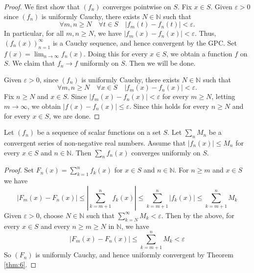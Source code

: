 \documentclass[a4paper]{article}
\begin{document}
\begin{proof}
    We first show that $\left(f_{n}\right)$ converges pointwise on $S$. Fix $x \in S$. Given $\varepsilon>0$ since $\left(f_{n}\right)$ is uniformly Cauchy, there exists $N \in \mathbb{N}$ such that
    \[
    \forall m, n \geqslant N \quad \forall t \in S \quad\left|f_{m}(t)-f_{n}(t)\right|<\varepsilon.
    \]
    In particular, for all $m, n \geqslant N$, we have $\left|f_{m}(x)-f_{n}(x)\right|<\varepsilon$. Thus, $\left(f_{n}(x)\right)_{n=1}^{\infty}$ is a Cauchy sequence, and hence convergent by the GPC. Set $f(x)=\lim _{n \rightarrow \infty} f_{n}(x)$. Doing this for every $x \in S$, we obtain a function $f$ on $S$.
    We claim that $f_{n} \rightarrow f$ uniformly on $S$. Then we will be done. 
    
    Given $\varepsilon>0$, since $\left(f_{n}\right)$ is uniformly Cauchy, there exists $N \in \mathbb{N}$ such that
    \[
    \forall m, n \geqslant N \quad \forall x \in S \quad\left|f_{m}(x)-f_{n}(x)\right|<\varepsilon.
    \]
    Fix $n \geqslant N$ and $x \in S$. Since $\left|f_{m}(x)-f_{n}(x)\right|<\varepsilon$ for every $m \geqslant N$, letting $m \rightarrow \infty$, we obtain $\left|f(x)-f_{n}(x)\right| \leqslant \varepsilon$. Since this holds for every $n \geqslant N$ and for every $x \in S$, we are done.
\end{proof}
\begin{theorem}\label{thm:7}
    Let $\left(f_{n}\right)$ be a sequence of scalar functions on a set $S$. Let $\sum_{n} M_{n}$ be a convergent series of non-negative real numbers. Assume that $\left|f_{n}(x)\right| \leqslant M_{n}$ for every $x \in S$ and $n \in \mathbb{N}$. Then $\sum_{n} f_{n}(x)$ converges uniformly on $S$.
\end{theorem}
\begin{proof}
    Set $F_{n}(x)=\sum_{k=1}^{n} f_{k}(x)$ for $x \in S$ and $n \in \mathbb{N}$. For $n \geqslant m$ and $x \in S$ we have
    \[
    \left|F_{m}(x)-F_{n}(x)\right| \leqslant\left|\sum_{k=m+1}^{n} f_{k}(x)\right| \leqslant \sum_{k=m+1}^{n}\left|f_{k}(x)\right| \leqslant \sum_{k=m+1}^{n} M_{k}
    \]
    Given $\varepsilon>0$, choose $N \in \mathbb{N}$ such that $\sum_{k=N}^{\infty} M_{k}<\varepsilon$. Then by the above, for every $x \in S$ and every $n \geqslant m \geqslant N$ in $\mathbb{N}$, we have
    \[
    \left|F_{m}(x)-F_{n}(x)\right| \leqslant \sum_{k=m+1}^{n} M_{k}<\varepsilon
    \]
    So $\left(F_{n}\right)$ is uniformly Cauchy, and hence uniformly convergent by Theorem \ref{thm:6}.
\end{proof}
\end{document}
